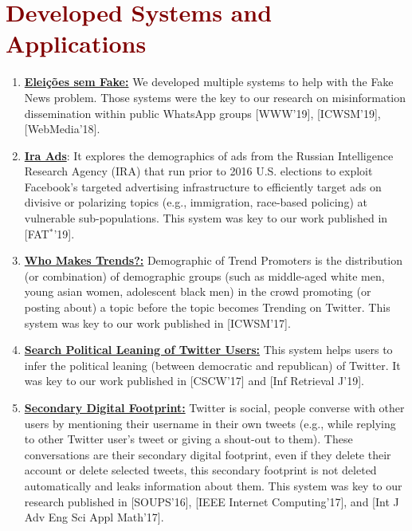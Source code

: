 \section*{\textcolor{maroon}{\normalsize Developed Systems and Applications}} 

\begin{enumerate}

\item \textbf{\href{https://www.eleicoessemfake.dcc.ufmg.br}{Eleições sem Fake:}} We developed multiple systems to help with the Fake News problem. Those systems were the key to our research on misinformation dissemination within public WhatsApp groups [WWW'19], [ICWSM'19], [WebMedia'18].
\item \textbf{\href{http://blackbird.dcc.ufmg.br/ira_ads/}{Ira Ads}}: It explores the demographics of ads from the Russian Intelligence Research Agency (IRA) that run prior to 2016 U.S. elections to exploit Facebook's targeted advertising infrastructure to efficiently target ads on divisive or polarizing topics (e.g., immigration, race-based policing) at vulnerable sub-populations. This system was key to our work published in [FAT$^{*}$'19].
\item \textbf{\href{https://twitter-app.mpi-sws.org/who-makes-trends/}{Who Makes Trends?:}} Demographic of Trend Promoters is the distribution (or combination) of demographic groups (such as middle-aged white men, young asian women, adolescent black men) in the crowd promoting (or posting about) a topic before the topic becomes Trending on Twitter. This system was key to our work published in [ICWSM'17].
\item \textbf{\href{http://twitter-app.mpi-sws.org/search-political-bias-of-users/}{Search Political Leaning of Twitter Users:}} This system helps users to infer the political leaning (between democratic and republican) of Twitter. It was key to our work published in [CSCW'17] and [Inf Retrieval J'19].
\item \textbf{\href{http://twitter-app.mpi-sws.org/footprint/}{Secondary Digital Footprint:}} Twitter is social, people converse with other users by mentioning their username in their own tweets (e.g., while replying to other Twitter user's tweet or giving a shout-out to them). These conversations are their secondary digital footprint, even if they delete their account or delete selected tweets, this secondary footprint is not deleted automatically and leaks information about them. This system was key to our research published in [SOUPS'16], [IEEE Internet Computing'17], and [Int J Adv Eng Sci Appl Math'17].

\end{enumerate}

